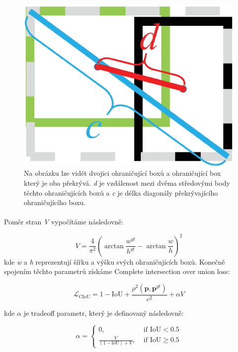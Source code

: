 \begin{figure}[h]\centering
    \centering
    \includegraphics[width=0.6\linewidth]{obrazky-figures/distance.png}
    \caption{Na obrázku lze vidět dvojici ohraničující boxů a ohraničující box který je oba překrývá. \textit{d} je vzdálenost mezi dvěma středovými body těchto ohraničujících boxů a \textit{c} je délka diagonály překrývajícího ohraničujícího boxu\protect\footnotemark{}.}
    \label{distance}
\end{figure}
\paragraph{} Poměr stran \textit{V} vypočítáme následovně:

\begin{equation}
V=\frac{4}{\pi^2}\left(\arctan \frac{w^{g t}}{h^{g t}}-\arctan \frac{w}{h}\right)^2
\end{equation}
kde \textit{w} a \textit{h} reprezentují šířku a výšku svých ohraničujících boxů. Konečně spojením těchto parametrů získáme Complete intersection over union loss:

\begin{equation}
\mathcal{L}_{\mathrm{CIoU}}=1-\mathrm{IoU}+\frac{\rho^2\left(\boldsymbol{p}, \boldsymbol{p}^{g t}\right)}{c^2}+\alpha V
\end{equation}

kde \begin{math}\alpha\end{math} je tradeoff parametr, který je definovaný následovně:

\begin{equation}
\alpha= \begin{cases}0, & \text { if } \mathrm{IoU}<0.5 \\ \frac{V}{(1-\mathrm{loU})+V}, & \text { if } \mathrm{IoU} \geq 0.5\end{cases}
\end{equation}


